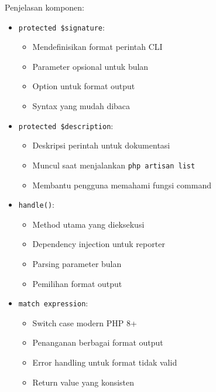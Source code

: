 \documentclass[a4paper]{report}
\begin{document}
Penjelasan komponen:
\begin{itemize}
\item \texttt{protected \$signature}:
    \begin{itemize}
    \item Mendefinisikan format perintah CLI
    \item Parameter opsional untuk bulan
    \item Option untuk format output
    \item Syntax yang mudah dibaca
    \end{itemize}

\item \texttt{protected \$description}:
    \begin{itemize}
    \item Deskripsi perintah untuk dokumentasi
    \item Muncul saat menjalankan \texttt{php artisan list}
    \item Membantu pengguna memahami fungsi command
    \end{itemize}

\item \texttt{handle()}:
    \begin{itemize}
    \item Method utama yang dieksekusi
    \item Dependency injection untuk reporter
    \item Parsing parameter bulan
    \item Pemilihan format output
    \end{itemize}

\item \texttt{match expression}:
    \begin{itemize}
    \item Switch case modern PHP 8+
    \item Penanganan berbagai format output
    \item Error handling untuk format tidak valid
    \item Return value yang konsisten
    \end{itemize}
\end{itemize}
\end{document}
